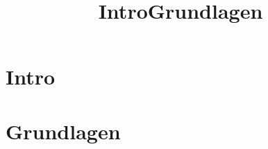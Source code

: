 %
%
%
\title[Intro]{Intro}
\section{Intro}
\begin{frame}
\titlepage
\end{frame}
\subtitle{}


\title[Grundlagen]{Grundlagen}
\section{Grundlagen}
\begin{frame}
\titlepage
\end{frame}
\subtitle{}


